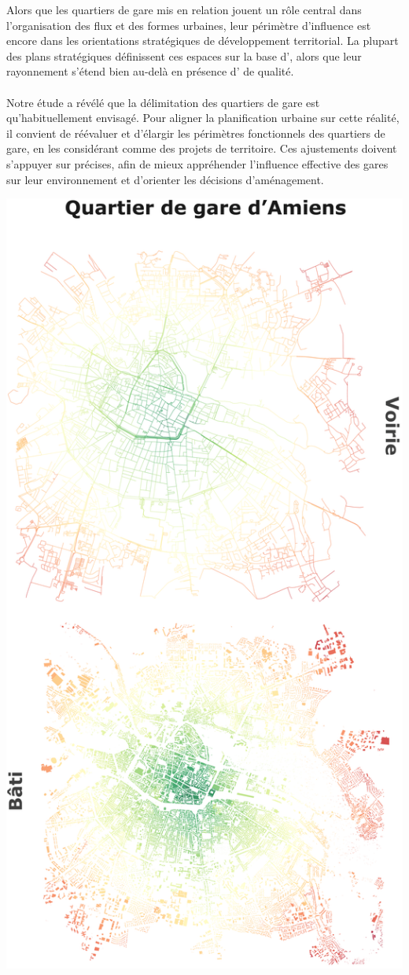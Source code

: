 \documentclass[../main.tex]{subfiles}
\begin{document}
    \begin{multicols}{2}
    \raggedcolumns
    \small{
Alors que les quartiers de gare mis en relation jouent un rôle central dans l'organisation des flux et des formes urbaines, leur périmètre d'influence est encore  dans les orientations stratégiques de développement territorial. La plupart des plans stratégiques définissent ces espaces sur la base d’, alors que leur rayonnement s’étend bien au-delà en présence d' de qualité.
    \\\\
Notre étude a révélé que la délimitation  des quartiers de gare est  qu'habituellement envisagé. Pour aligner la planification urbaine sur cette réalité, il convient de réévaluer et d'élargir les périmètres fonctionnels des quartiers de gare, en les considérant comme des projets de territoire. Ces ajustements doivent s’appuyer sur  précises, afin de mieux appréhender l’influence effective des gares sur leur environnement et d'orienter les décisions d’aménagement.
    }
\begin{center}
    \includegraphics[width=0.7\columnwidth]{figures/policy-brief-isochrone-amiens.png}

\end{center}
\end{multicols}
\end{document}
